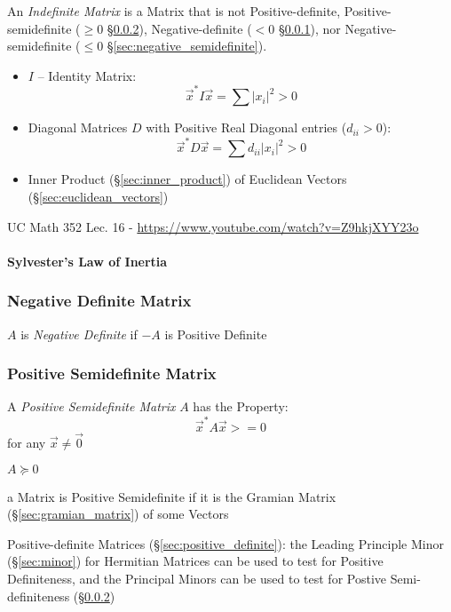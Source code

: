 An \emph{Indefinite Matrix} is a Matrix that is not Positive-definite,
Positive-semidefinite ($\geq 0$ \S\ref{sec:positive_semidefinite}),
Negative-definite ($< 0$ \S\ref{sec:negative_definite}), nor
Negative-semidefinite ($\leq 0$ \S\ref{sec:negative_semidefinite}).

\begin{itemize}
  \item $I$ -- Identity Matrix:
    \[
      \vec{x}^*I\vec{x} = \sum |x_i|^2 > 0
    \]
  \item Diagonal Matrices $D$ with Positive Real Diagonal entries ($d_{ii} >
    0$):
    \[
      \vec{x}^*D\vec{x} = \sum d_{ii}|x_i|^2 > 0
    \]
  \item Inner Product (\S\ref{sec:inner_product}) of Euclidean Vectors
    (\S\ref{sec:euclidean_vectors})
\end{itemize}


UC Math 352 Lec. 16 - \url{https://www.youtube.com/watch?v=Z9hkjXYY23o}



\paragraph{Sylvester's Law of Inertia}\label{sec:sylversters_law}\hfill



\subsubsection{Negative Definite Matrix}\label{sec:negative_definite}

$A$ is \emph{Negative Definite} if $-A$ is Positive Definite



\subsubsection{Positive Semidefinite Matrix}\label{sec:positive_semidefinite}

A \emph{Positive Semidefinite Matrix} $A$ has the Property:
\[
  \vec{x}^* A \vec{x} >= 0
\]
for any $\vec{x} \neq \vec{0}$

$A \succeq 0$

a Matrix is Positive Semidefinite if it is the Gramian Matrix
(\S\ref{sec:gramian_matrix}) of some Vectors

Positive-definite Matrices (\S\ref{sec:positive_definite}): the Leading
Principle Minor (\S\ref{sec:minor}) for Hermitian Matrices can be used to test
for Positive Definiteness, and the Principal Minors can be used to test for
Postive Semi-definiteness (\S\ref{sec:positive_semidefinite})

